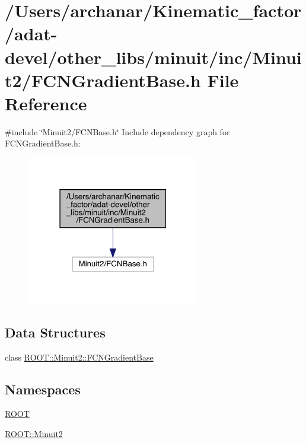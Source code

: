 \hypertarget{adat-devel_2other__libs_2minuit_2inc_2Minuit2_2FCNGradientBase_8h}{}\section{/\+Users/archanar/\+Kinematic\+\_\+factor/adat-\/devel/other\+\_\+libs/minuit/inc/\+Minuit2/\+F\+C\+N\+Gradient\+Base.h File Reference}
\label{adat-devel_2other__libs_2minuit_2inc_2Minuit2_2FCNGradientBase_8h}
{\ttfamily \#include \char`\"{}Minuit2/\+F\+C\+N\+Base.\+h\char`\"{}}\newline
Include dependency graph for F\+C\+N\+Gradient\+Base.\+h\+:
\nopagebreak
\begin{figure}[H]
\begin{center}
\leavevmode
\includegraphics[width=214pt]{dd/da0/adat-devel_2other__libs_2minuit_2inc_2Minuit2_2FCNGradientBase_8h__incl}
\end{center}
\end{figure}
\subsection*{Data Structures}
\begin{DoxyCompactItemize}
\item 
class \mbox{\hyperlink{classROOT_1_1Minuit2_1_1FCNGradientBase}{R\+O\+O\+T\+::\+Minuit2\+::\+F\+C\+N\+Gradient\+Base}}
\end{DoxyCompactItemize}
\subsection*{Namespaces}
\begin{DoxyCompactItemize}
\item 
 \mbox{\hyperlink{namespaceROOT}{R\+O\+OT}}
\item 
 \mbox{\hyperlink{namespaceROOT_1_1Minuit2}{R\+O\+O\+T\+::\+Minuit2}}
\end{DoxyCompactItemize}
